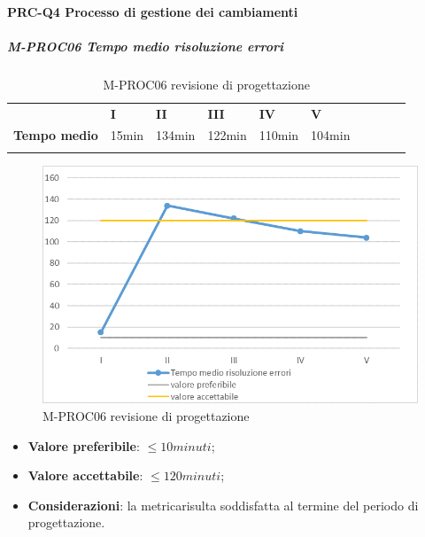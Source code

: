\paragraph*{PRC-Q4 Processo di gestione dei cambiamenti}
\subparagraph{M-PROC06 Tempo medio risoluzione errori} \mbox{}
\begin{longtable}[H!] {						
		>{}p{38mm}  		
		>{}p{12mm}
		>{}p{12mm}		
		>{}p{12mm}		
		>{}p{12mm}		
		>{}p{12mm}		
		>{}p{12mm}
		>{}p{12mm}
		>{}p{12mm}
		>{}p{12mm}
	}
	\rowcolor{gray!50}
	\textbf{} & \textbf{I} & \textbf{II} & \textbf{III} & \textbf{IV} & \textbf{V} \TBstrut \\ [2mm]
	\textbf{Tempo medio} & 15min & 134min & 122min & 110min & 104min \TBstrut \\ [2mm]
	\rowcolor{white}
	\caption{M-PROC06 revisione di progettazione\glo}
\end{longtable}
\begin{figure}[H] 	
	\includegraphics[width=\linewidth]{./img/grafici/RP12.png}	
	\caption{M-PROC06 revisione di progettazione\glo}	
\end{figure}
\begin{itemize}
	\item \textbf{Valore preferibile}: $\le10minuti$;
	\item \textbf{Valore accettabile}: $\le120minuti$;
	\item \textbf{Considerazioni}: la metrica\glosp risulta soddisfatta al termine del periodo di progettazione\glo.
\end{itemize}

